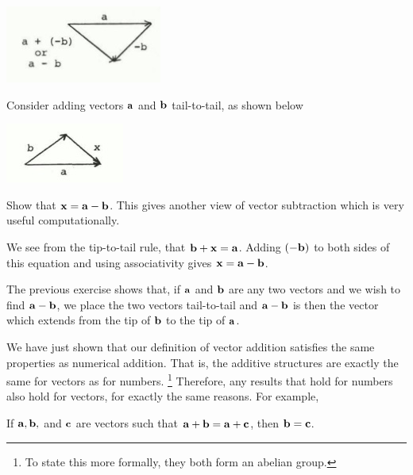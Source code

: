 \documentclass[12pt,letterpaper,reqno]{article}
\numberwithin{equation}{section}
\begin{document}
\begin{center}
	\includegraphics[scale=0.5]{figures_mvc/a_minus_b}
\end{center}

\begin{exercise}
Consider adding vectors ${\bf a}$ and ${\bf b}$ tail-to-tail, as shown below
	\begin{center}
		\includegraphics[scale=0.5]{figures_mvc/b_plus_x_equals_a}
	\end{center}
	Show that ${\bf x}={\bf a}-{\bf b}$. This gives another view of vector subtraction which is very useful computationally.
\end{exercise}

{\color{red} 
We see from the tip-to-tail rule, that ${\bf b}+{\bf x}={\bf a}$. Adding $(-{\bf b})$ to both sides of this equation and using associativity gives ${\bf x}={\bf a}-{\bf b}$.}

The previous exercise shows that, if ${\bf a}$ and ${\bf b}$ are any two vectors and we wish to find ${\bf a}-{\bf b}$, we place the two vectors tail-to-tail and ${\bf a}-{\bf b}$ is then the vector which extends from the tip of ${\bf b}$ to the tip of ${\bf a}$.

We have just shown that our definition of vector addition satisfies the same properties as numerical addition. That is, the additive structures are exactly the same for vectors as for numbers. \footnote{To state this more formally, they both form an abelian group.} Therefore, any results that hold for numbers also hold for vectors, for exactly the same reasons. For example,

\begin{thm}
	If ${\bf a}, {\bf b},$ and ${\bf c}$ are vectors such that ${\bf a}+{\bf b}={\bf a}+{\bf c}$, then ${\bf b}={\bf c}$. 
\end{thm}
\end{document}
